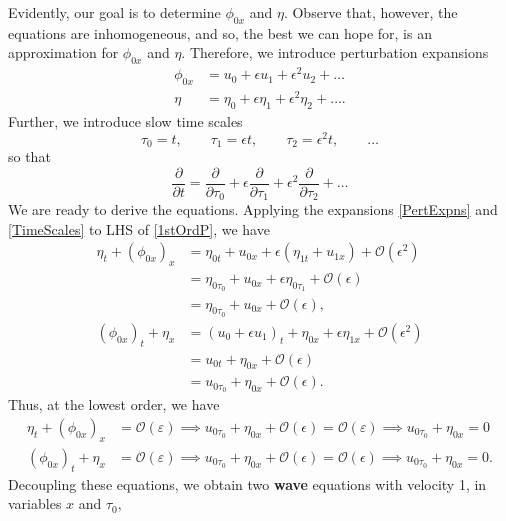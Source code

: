 \documentclass[10pt,reqno,oneside,a4paper]{article}
\begin{document}
Evidently, our goal is to determine $\phi_{0x}$ and $\eta.$ Observe that, however, the equations are inhomogeneous, and so, the best we can hope for, is an approximation for $\phi_{0x}$ and $\eta.$ Therefore, we introduce perturbation expansions
\begin{subequations} \label{PertExpns}
\begin{align}
\phi_{0x} &= u_0 + \epsilon u_1 + \epsilon^2 u_2 + \ldots \\
\eta &= \eta_0 + \epsilon \eta_1 + \epsilon^2 \eta_2 + \ldots.
\end{align}
\end{subequations}
Further, we introduce slow time scales 
\[ 
\tau_0 = t, \qquad \tau_1 = \epsilon t, \qquad \tau_2 = \epsilon^2 t, \qquad \ldots
\]
so that 
\begin{equation}\label{TimeScales}
\frac{\partial}{\partial t} = \frac{\partial}{\partial \tau_0} +  \epsilon\frac{\partial}{\partial \tau_1} + \epsilon^2 \frac{\partial}{\partial \tau_2} + \ldots 
\end{equation}
We are ready to derive the equations. Applying the expansions \eqref{PertExpns} and \eqref{TimeScales} to LHS of \eqref{1stOrdP}, we have
\begin{align*}
\eta_{t} + (\phi_{0x})_x &= \eta_{0t} + u_{0x} + \epsilon (\eta_{1t}+ u_{1x}) + \mathcal{O}(\epsilon^2) \\
&= \eta_{0\tau_0} + u_{0x} + \epsilon \eta_{0\tau_1} + \mathcal{O}(\epsilon) \\
&= \eta_{0\tau_0} + u_{0x} + \mathcal{O}(\epsilon), \\
(\phi_{0x})_t + \eta_x &= (u_0 + \epsilon u_1)_t + \eta_{0x} + \epsilon \eta_{1x} + \mathcal{O}(\epsilon^2) \\
&= u_{0t} + \eta_{0x} + \mathcal{O}(\epsilon) \\
&= u_{0\tau_0} + \eta_{0x} + \mathcal{O}(\epsilon).
\end{align*}
Thus, at the lowest order, we have
\begin{align*}
\eta_{t}  +  (\phi_{0x})_x &= \mathcal{O}(\varepsilon) \implies u_{0\tau_0} + \eta_{0x} + \mathcal{O}(\epsilon)= \mathcal{O}(\varepsilon) \implies u_{0\tau_0} + \eta_{0x} = 0 \\
(\phi_{0x})_t + \eta_x &= \mathcal{O}(\varepsilon) \implies u_{0\tau_0} + \eta_{0x} + \mathcal{O}(\epsilon) = \mathcal{O}(\epsilon) \implies u_{0\tau_0} + \eta_{0x} = 0.
\end{align*}
Decoupling these equations, we obtain two \textbf{wave} equations with velocity 1, in variables $x$ and $\tau_0,$
\end{document}
